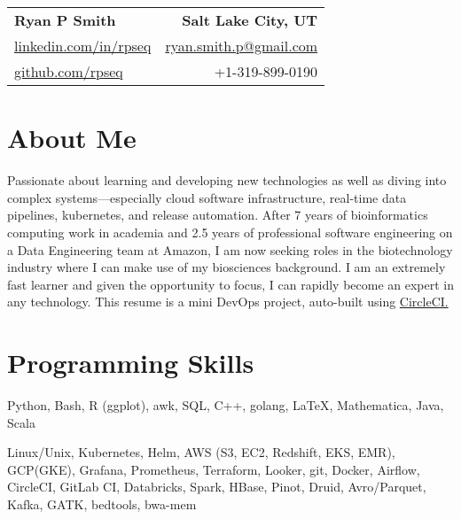 
\RequirePackage{preamble}



\begin{tabular*}{\textwidth}{l@{\extracolsep{\fill}}r}
	\textbf{{\Large Ryan P Smith}} & \textbf{Salt Lake City, UT} \\
	\href{http://www.linkedin.com/in/rpseq}{linkedin.com/in/rpseq} &
	\href{mailto:ryan.smith.p@gmail.com}{ryan.smith.p@gmail.com} \\
	\href{https://github.com/RPSeq}{github.com/rpseq} & +1-319-899-0190 \\
\end{tabular*}

\section{About Me}

\small{Passionate about learning and developing new technologies as well as diving into complex systems---especially cloud software infrastructure, real-time data pipelines, kubernetes, and release automation. After 7 years of bioinformatics computing work in academia and 2.5 years of professional software engineering on a Data Engineering team at Amazon, I am now seeking roles in the biotechnology industry where I can make use of my biosciences background. I am an extremely fast learner and given the opportunity to focus, I can rapidly become an expert in any technology. This resume is a mini DevOps project, auto-built using \href{https://circleci.com/gh/RPSeq/resume}{CircleCI.}}


\section{Programming Skills}
\resumeSubHeadingListStart

{Python, Bash, R (ggplot), awk, SQL, C++, golang, \LaTeX, Mathematica, Java, Scala}

{Linux/Unix, Kubernetes, Helm, AWS (S3, EC2, Redshift, EKS, EMR), GCP(GKE), Grafana, Prometheus, Terraform, Looker, git, Docker, Airflow, CircleCI, GitLab CI, Databricks, Spark, HBase, Pinot, Druid, Avro/Parquet, Kafka, GATK, bedtools, bwa-mem}

